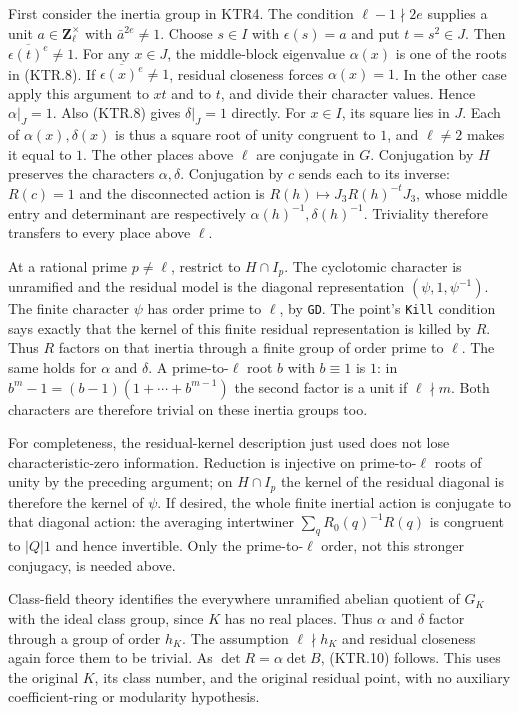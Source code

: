 First consider the inertia group in KTR4.  The condition
\(\ell-1\nmid2e\) supplies a unit
\(a\in\mathbf Z_\ell^\times\) with
\(\bar a^{2e}\ne1\).  Choose \(s\in I\) with
\(\epsilon(s)=a\) and put \(t=s^2\in J\).
Then \(\overline{\epsilon(t)^e}\ne1\).
For any \(x\in J\), the middle-block eigenvalue
\(\alpha(x)\) is one of the roots in (KTR.8).
If \(\overline{\epsilon(x)^e}\ne1\), residual closeness
forces \(\alpha(x)=1\).  In the other case apply this
argument to \(xt\) and to \(t\), and divide their character
values.  Hence \(\alpha|_J=1\).  Also (KTR.8) gives
\(\delta|_J=1\) directly.  For \(x\in I\), its square
lies in \(J\).  Each of \(\alpha(x),\delta(x)\) is thus
a square root of unity congruent to \(1\), and \(\ell\ne2\)
makes it equal to \(1\).  The other places above \(\ell\)
are conjugate in \(G\).  Conjugation by \(H\) preserves
the characters \(\alpha,\delta\).  Conjugation by \(c\)
sends each to its inverse: \(R(c)=1\) and the disconnected
action is \(R(h)\mapsto J_3R(h)^{-t}J_3\), whose middle
entry and determinant are respectively
\(\alpha(h)^{-1},\delta(h)^{-1}\).
Triviality therefore transfers to every place above \(\ell\).

At a rational prime \(p\ne\ell\), restrict to
\(H\cap I_p\).  The cyclotomic character is unramified and
the residual model is the diagonal representation
\((\psi,1,\psi^{-1})\).  The finite character \(\psi\)
has order prime to \(\ell\), by \texttt{GD}.  The point's
\texttt{Kill} condition says exactly that the kernel of this
finite residual representation is killed by \(R\).
Thus \(R\) factors on that inertia through a finite group
of order prime to \(\ell\).  The same holds for \(\alpha\)
and \(\delta\).  A prime-to-\(\ell\) root \(b\) with
\(b\equiv1\) is \(1\): in
\(b^m-1=(b-1)(1+\cdots+b^{m-1})\) the second factor is a
unit if \(\ell\nmid m\).  Both characters are therefore
trivial on these inertia groups too.

For completeness, the residual-kernel description just used does
not lose characteristic-zero information.  Reduction is injective
on prime-to-\(\ell\) roots of unity by the preceding argument;
on \(H\cap I_p\) the kernel of the residual diagonal is
therefore the kernel of \(\psi\).  If desired, the whole
finite inertial action is conjugate to that diagonal action:
the averaging intertwiner
\(\sum_{q}R_0(q)^{-1}R(q)\) is congruent to \(|Q|1\)
and hence invertible.  Only the prime-to-\(\ell\) order,
not this stronger conjugacy, is needed above.

Class-field theory identifies the everywhere unramified abelian
quotient of \(G_K\) with the ideal class group, since \(K\)
has no real places.  Thus \(\alpha\) and \(\delta\)
factor through a group of order \(h_K\).  The assumption
\(\ell\nmid h_K\) and residual closeness again force them
to be trivial.  As \(\det R=\alpha\det B\), (KTR.10)
follows.  This uses the original \(K\), its class number, and
the original residual point, with no auxiliary coefficient-ring
or modularity hypothesis.

